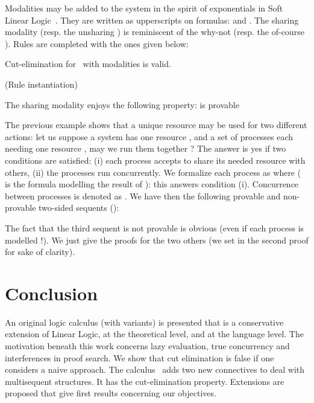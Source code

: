 \documentclass{llncs}
\begin{document}
Modalities may be added to the system in the spirit of exponentials in Soft Linear Logic~\cite{DBLP:journals/tcs/Lafont04}.
They are written as upperscripts on formulas:  and .
The sharing  modality (resp. the unsharing ) is reminiscent of the why-not  (resp. the of-course ). Rules are completed with the ones given below:



\begin{proposition}
Cut-elimination for \CMALL\ with modalities is valid.
\end{proposition}

\begin{example}(Rule instantiation)

\end{example}




The sharing modality enjoys the following property:  is provable


The previous example shows that a unique resource  may be used for two different actions: let us suppose a system has one resource , and a set of processes each needing 
one resource , may we run them together ? The answer is yes if two conditions
are satisfied: (i) each process accepts to share its needed resource with others,
(ii) the processes run concurrently.
We formalize each process  as  where  ( is
the formula modelling the result of ): this answers condition (i).
Concurrence between processes is denoted as .
We have then the following provable and non-provable two-sided sequents ():




The fact that the third sequent is not provable is obvious (even if each process is modelled  !). We just give the proofs for the two others (we set  in the
second proof for sake of clarity).







 


\section{Conclusion}\label{sec:conclusion}



An original logic calculus (with variants) is presented that is a conservative extension of Linear Logic, at the theoretical level, and at the language level. 
The motivation beneath this work concerns lazy evaluation,
true concurrency and interferences in proof search.
We show that cut elimination is false if one considers a naive approach. The calculus \CMALL\ adds two new connectives to deal with multisequent structures. It has the cut-elimination property. Extensions are proposed that give first results concerning our objectives.
 
\end{document}
